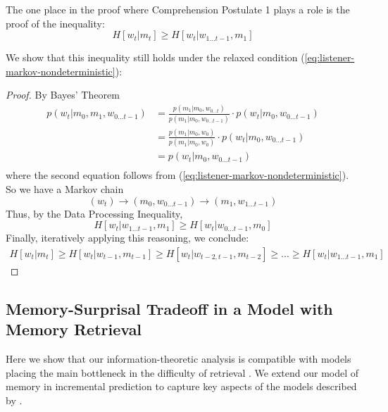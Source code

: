 \documentclass[11pt,letterpaper]{article}
\begin{document}
The one place in the proof where Comprehension Postulate 1 plays a role is the proof of the inequality:
\begin{equation}
	H[w_t | m_t] \geq H[w_t|w_{1 \dots t-1}, m_1]
\end{equation}

We show that this inequality still holds under the relaxed condition (\ref{eq:listener-markov-nondeterministic}):
\begin{proof}
	By Bayes' Theorem
\begin{align*}
	p(w_t|m_0, m_1, w_{0\dots t-1}) &= \frac{p(m_1|m_0, w_{0\dots t})}{p(m_1|m_0, w_{0\dots t-1})} \cdot p(w_t|m_0, w_{0\dots t-1}) \\
 &= \frac{p(m_1|m_0, w_{0})}{p(m_1|m_0, w_{0})} \cdot p(w_t|m_0, w_{0\dots t-1}) \\
 &= p(w_t|m_0, w_{0\dots t-1}) \\
\end{align*}
	where the second equation follows from (\ref{eq:listener-markov-nondeterministic}).
So we have a Markov chain
\begin{equation}
(w_t) \rightarrow (m_0, w_{0 \dots t-1})   \rightarrow   (m_1, w_{1 \dots t-1})
\end{equation}
Thus, by the Data Processing Inequality,
\begin{equation}
H[w_t| w_{1 \dots t-1}, m_{1}] \geq H[w_t|w_{0 \dots t-1}, m_0]
\end{equation}
Finally, iteratively applying this reasoning, we conclude:
\begin{align*}
H[w_t | m_t] \geq H[w_t| w_{t-1}, m_{t-1}] \geq H[w_t| w_{t-2, t-1}, m_{t-2}] \geq ... \geq H[w_t|w_{1 \dots t-1}, m_1]
\end{align*}
\end{proof}


\subsection{Memory-Surprisal Tradeoff in a Model with Memory Retrieval}

Here we show that our information-theoretic analysis is compatible with models placing the main bottleneck in the difficulty of retrieval \citep{mcelree2000sentence,lewis-activation-based-2005,nicenboim2018models,vasishth2019computational}.
We extend our model of memory in incremental prediction to capture key aspects of the models described by \citet{lewis-activation-based-2005,nicenboim2018models,vasishth2019computational}.
\end{document}
